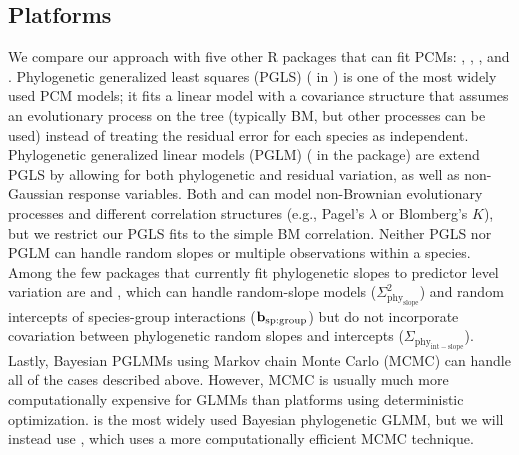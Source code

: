 \documentclass[12pt]{article}
\begin{document}
\subsection*{Platforms}

We compare our approach with five other R packages that can fit PCMs:  \citep{pinheiro2014r},  \citep{ho2014phylolm},  \citep{pearse2015pez},  \citep{phyr} and  \citep{burkner2018brms}.
Phylogenetic generalized least squares (PGLS) ( in ) is one of the most widely used PCM models; it fits a linear model with a covariance structure that assumes an evolutionary process on the tree (typically BM, but other processes can be used) instead of treating the residual error for each species as independent.
Phylogenetic generalized linear models (PGLM) ( in the  package) are extend PGLS by allowing for both phylogenetic and residual variation, as well as non-Gaussian response variables.
Both  and  can model non-Brownian evolutionary processes and different correlation structures (e.g., Pagel's $\lambda$ or Blomberg's $K$), but we restrict our PGLS fits to the simple BM correlation.
Neither PGLS nor PGLM can handle random slopes or multiple observations within a species.
Among the few packages that currently fit phylogenetic slopes to predictor level variation are  and , which can handle random-slope models ($\Sigma^2_{\mathrm{phy_{slope}}}$) and random intercepts of species-group interactions ($\bf{b_{\mathrm{sp:group}}}$) but do not incorporate covariation between phylogenetic random slopes and intercepts ($\Sigma_{\mathrm{phy_{int-slope}}}$).
Lastly, Bayesian PGLMMs using Markov chain Monte Carlo (MCMC) can handle all of the cases described above. 
However, MCMC is usually much more computationally expensive for GLMMs than platforms using deterministic optimization.
 \citep{hadfield2010general} is the most widely used Bayesian phylogenetic GLMM, but we will instead use , which uses a more computationally efficient MCMC technique.
 
\end{document}
